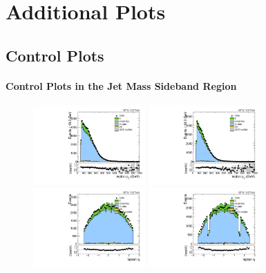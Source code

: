 
\chapter{Additional Plots}
\label{chap:appendixAnalysis}

\section{Control Plots}

\subsubsection{Control Plots in the Jet Mass Sideband Region}

\begin{figure}[htbp]
  \centering
  \includegraphics[width=0.3825\textwidth]{fig/analysisAppendix/SB_b1_mu_allP_allC_allD_Run2_lnujj_l1_l_pt.pdf}
  \includegraphics[width=0.3825\textwidth]{fig/analysisAppendix/SB_b1_e_allP_allC_allD_Run2_lnujj_l1_l_pt.pdf}\\
  \includegraphics[width=0.3825\textwidth]{fig/analysisAppendix/SB_b1_mu_allP_allC_allD_Run2_lnujj_l1_l_eta.pdf}
  \includegraphics[width=0.3825\textwidth]{fig/analysisAppendix/SB_b1_e_allP_allC_allD_Run2_lnujj_l1_l_eta.pdf}\\

\end{figure}
